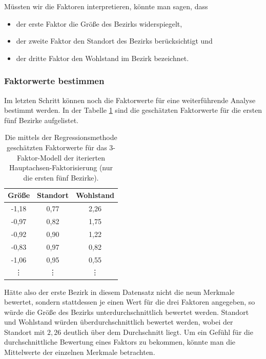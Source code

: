 \documentclass[11pt]{scrartcl}
\begin{document}
	\newpage
	Müssten wir die Faktoren interpretieren, könnte man sagen, dass
	\begin{itemize}
		\item der erste Faktor die Größe des Bezirks widerspiegelt,
	    \item der zweite Faktor den Standort des Bezirks berücksichtigt und
		\item der dritte Faktor den Wohlstand im Bezirk bezeichnet.
	\end{itemize}

	\subsubsection*{Faktorwerte bestimmen} Im letzten Schritt können noch die Faktorwerte für eine weiterführende Analyse bestimmt werden. In der Tabelle \ref{tab:Faktorwerte} sind die geschätzten Faktorwerte für die ersten fünf Bezirke aufgelistet.
	\begin{table}[h]
		\centering
		\begin{tabular}{@{}ccc@{}}
			\toprule
			\textbf{Größe} & \textbf{Standort} & \textbf{Wohlstand} \\ \midrule
			-1,18          & 0,77              & 2,26               \\
			-0,97          & 0,82              & 1,75               \\
			-0,92          & 0,90              & 1,22               \\
			-0,83          & 0,97              & 0,82               \\
			-1,06          & 0,95              & 0,55               \\ 
			\vdots & \vdots & \vdots \\ \bottomrule
		\end{tabular}
		\caption{Die mittels der Regressionsmethode geschätzten Faktorwerte für das 3-Faktor-Modell der iterierten Hauptachsen-Faktorisierung (nur die ersten fünf Bezirke).}
		\label{tab:Faktorwerte}
	\end{table}
    Hätte also der erste Bezirk in diesem Datensatz nicht die neun Merkmale bewertet, sondern stattdessen je einen Wert für die drei Faktoren angegeben, so würde die Größe des Bezirks unterdurchschnittlich bewertet werden. Standort und Wohlstand würden überdurchschnittlich bewertet werden, wobei der Standort mit
	$2{,}26$ deutlich über dem Durchschnitt liegt. Um ein Gefühl für die durchschnittliche Bewertung eines Faktors
	zu bekommen, könnte man die Mittelwerte der einzelnen Merkmale betrachten.
	
\end{document}
